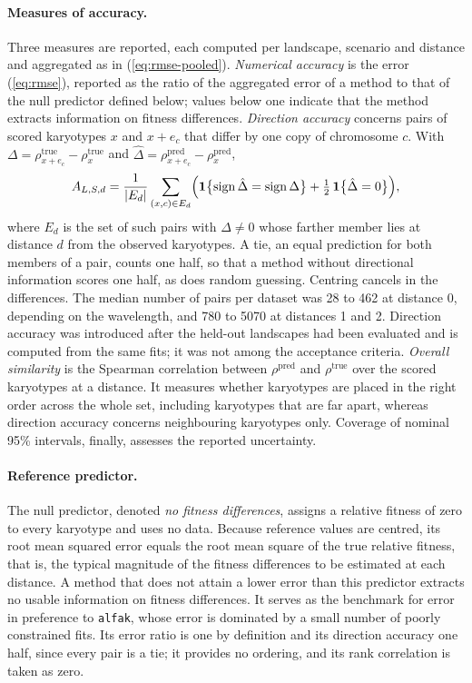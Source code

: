 \documentclass[11pt]{article}
\begin{document}
\paragraph{Measures of accuracy.}
Three measures are reported, each computed per landscape, scenario and
distance and aggregated as in (\ref{eq:rmse-pooled}).
\emph{Numerical accuracy} is the error (\ref{eq:rmse}), reported as the ratio
of the aggregated error of a method to that of the null predictor defined
below; values below one indicate that the method extracts information on
fitness differences. \emph{Direction accuracy} concerns pairs of scored
karyotypes $x$ and $x+e_c$ that differ by one copy of chromosome $c$. With
$\Delta=\rho^{\mathrm{true}}_{x+e_c}-\rho^{\mathrm{true}}_x$ and
$\hat\Delta=\rho^{\mathrm{pred}}_{x+e_c}-\rho^{\mathrm{pred}}_x$,
\begin{equation}
  A_{L,S,d}=\frac{1}{|E_d|}\sum_{(x,c)\in E_d}
  \Bigl(\mathbf{1}\bigl\{\operatorname{sign}\hat\Delta=\operatorname{sign}\Delta\bigr\}
  +\tfrac12\,\mathbf{1}\bigl\{\hat\Delta=0\bigr\}\Bigr),
  \label{eq:direction}
\end{equation}
where $E_d$ is the set of such pairs with $\Delta\neq0$ whose farther member
lies at distance $d$ from the observed karyotypes. A tie, an equal prediction
for both members of a pair, counts one half, so that a method without
directional information scores one half, as does random guessing. Centring
cancels in the differences. The median number of pairs per dataset was 28 to
462 at distance 0, depending on the wavelength, and 780 to 5070 at distances 1
and 2. Direction accuracy was introduced after the held-out landscapes had
been evaluated and is computed from the same fits; it was not among the
acceptance criteria. \emph{Overall similarity} is the Spearman correlation
between $\rho^{\mathrm{pred}}$ and $\rho^{\mathrm{true}}$ over the scored
karyotypes at a distance. It measures whether karyotypes are placed in the
right order across the whole set, including karyotypes that are far apart,
whereas direction accuracy concerns neighbouring karyotypes only. Coverage of
nominal 95\% intervals, finally, assesses the reported uncertainty.

\paragraph{Reference predictor.}
The null predictor, denoted \emph{no fitness differences}, assigns a relative
fitness of zero to every karyotype and uses no data. Because reference values
are centred, its root mean squared error equals the root mean square of the
true relative fitness, that is, the typical magnitude of the fitness
differences to be estimated at each distance. A method that does not attain a
lower error than this predictor extracts no usable information on fitness
differences. It serves as the benchmark for error in preference to
\texttt{alfak}, whose error is dominated by a small number of poorly
constrained fits. Its error ratio is one by definition and its direction
accuracy one half, since every pair is a tie; it provides no ordering, and its
rank correlation is taken as zero.
\end{document}
